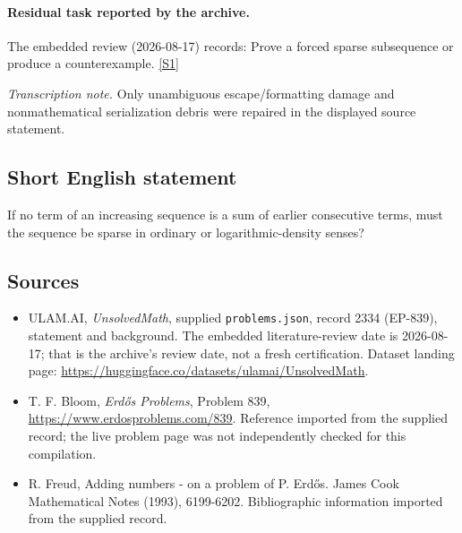 \documentclass[11pt,a4paper]{article}
\newcommand{\sref}[2]{\hyperlink{source:#1:#2}{[S#2]}}
\begin{document}
\paragraph{Residual task reported by the archive.}

The embedded review (2026-08-17) records: Prove a forced sparse subsequence or produce a counterexample. \sref{2334}{1}

{\small\emph{Transcription note.} Only unambiguous escape/formatting damage and nonmathematical serialization debris were repaired in the displayed source statement.}

\subsection{Short English statement}

If no term of an increasing sequence is a sum of earlier consecutive terms, must the sequence be sparse in ordinary or logarithmic-density senses?

\subsection{Sources}

{\small

\begin{itemize}

\item[\hypertarget{source:2334:1}{S1}] ULAM.AI, \emph{UnsolvedMath}, supplied \texttt{problems.json}, record 2334 (EP-839), statement and background. The embedded literature-review date is 2026-08-17; that is the archive’s review date, not a fresh certification. Dataset landing page: \url{https://huggingface.co/datasets/ulamai/UnsolvedMath}.

\item[\hypertarget{source:2334:2}{S2}] T. F. Bloom, \emph{Erdős Problems}, Problem 839, \url{https://www.erdosproblems.com/839}. Reference imported from the supplied record; the live problem page was not independently checked for this compilation.

\item[\hypertarget{source:2334:3}{S3}] R. Freud, Adding numbers - on a problem of P. Erd\H{o}s. James Cook Mathematical Notes (1993), 6199-6202. Bibliographic information imported from the supplied record.

\end{itemize}

}

\label{end:2334}
\end{document}

